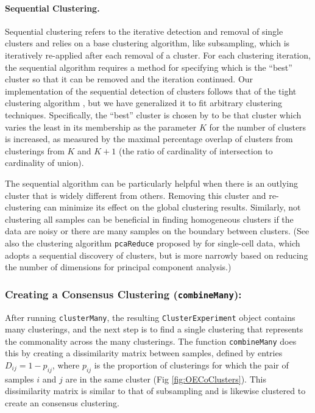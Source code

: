 \documentclass[10pt,letterpaper]{article}
\newcommand{\f}[1]{\texttt{#1}}
\begin{document}
\paragraph{Sequential Clustering.}

Sequential clustering refers to the iterative detection and removal of single clusters and relies on a base clustering algorithm, like subsampling, which is iteratively re-applied after each removal of a cluster. For each clustering iteration, the sequential algorithm requires a method for specifying which is the ``best'' cluster so that it can be removed and the iteration continued. Our implementation of the sequential detection of clusters follows that of the tight clustering algorithm \cite{Tseng:2005ir}, but we have generalized it to fit arbitrary clustering techniques. Specifically, the ``best'' cluster is chosen by \cite{Tseng:2005ir} to be that cluster which varies the least in its membership as the parameter $K$ for the number of clusters is increased, as measured by the maximal percentage overlap of clusters from clusterings from $K$ and $K+1$ (the ratio of cardinality of intersection to cardinality of union).

The sequential algorithm can be particularly helpful when there is an outlying cluster that is widely different from others. Removing this cluster and re-clustering can minimize its effect on the global clustering results. Similarly, not clustering all samples can be beneficial in finding homogeneous clusters if the data are noisy or there are many samples on the boundary between clusters. (See also the clustering algorithm \texttt{pcaReduce} proposed by \cite{Zurauskiene:2016ft} for single-cell data, which adopts a sequential discovery of clusters, but is more narrowly based on reducing the number of dimensions for principal component analysis.)

\subsubsection{Creating a Consensus Clustering (\f{combineMany}):}
\label{sec:combineMany}

After running \f{clusterMany}, the resulting \f{ClusterExperiment} object contains many clusterings, and the next step is to find a single clustering that represents the commonality across the many clusterings. The function \f{combineMany} does this by creating a dissimilarity matrix between samples, defined by entries $D_{ij}=1-p_{ij}$, where $p_{ij}$ is the proportion of clusterings for which the pair of samples $i$ and $j$ are in the same cluster (Fig \ref{fig:OECoClusters}). This dissimilarity matrix is similar to that of subsampling and is likewise clustered to create an consensus clustering. 
\end{document}
